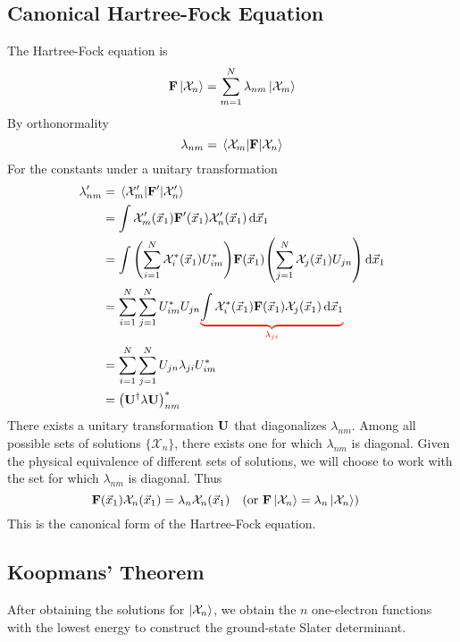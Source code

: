 \documentclass[12pt,a4paper,titlepage]{article}
\newcommand{\Chi}{\mathcal{X}} %
\begin{document}
\subsection{Canonical Hartree-Fock Equation}
The Hartree-Fock equation is
\begin{equation}
\vb{F}\ket{\Chi_{n}}=\sum_{m=1}^{N}\lambda_{nm}\ket{\Chi_{m}}
\end{equation}
By orthonormality
\begin{equation}
\lambda_{nm}=\mel{\Chi_{m}}{\vb{F}}{\Chi_{n}}
\end{equation}
For the constants under a unitary transformation
\begin{equation}
\begin{aligned}
\lambda_{nm}^{\prime}&=\mel{\Chi_{m}^{\prime}}{\vb{F}^{\prime}}{\Chi_{n}^{\prime}}\\
&=\int\Chi_{m}^{\prime}(\vec{x}_{1})\vb{F}^{\prime}(\vec{x}_{1})\Chi_{n}^{\prime}(\vec{x}_{1})\dd{\vec{x}_{1}}\\
&=\int\qty(\sum_{i=1}^{N}\Chi_{i}^{*}(\vec{x}_{1})U_{im}^{*})\vb{F}(\vec{x}_{1})\qty(\sum_{j=1}^{N}\Chi_{j}(\vec{x}_{1})U_{jn})\dd{\vec{x}_{1}}\\
&=\sum_{i=1}^{N}\sum_{j=1}^{N}U_{im}^{*}U_{jn}{\color{red}\underbrace{\color{black}\int\Chi_{i}^{*}(\vec{x}_{1})\vb{F}(\vec{x}_{1})\Chi_{j}(\vec{x}_{1})\dd{\vec{x}_{1}}}_{\lambda_{ji}}}\\
&=\sum_{i=1}^{N}\sum_{j=1}^{N}U_{jn}\lambda_{ji}U_{im}^{*}\\
&=\qty(\vb{U}^{\dagger}\vb{\lambda}\vb{U})^{*}_{nm}
\end{aligned}
\end{equation}
There exists a unitary transformation $\vb{U}$ that diagonalizes $\lambda_{nm}$. Among all possible sets of solutions $\{\Chi_{n}\}$, there exists one for which $\lambda_{nm}$ is diagonal. Given the physical equivalence of different sets of solutions, we will choose to work with the set for which $\lambda_{nm}$ is diagonal. Thus
\begin{equation}
\vb{F}(\vec{x}_{1})\Chi_{n}(\vec{x}_{1})=\lambda_{n}\Chi_{n}(\vec{x}_{1})\qq{(or $\vb{F}\ket{\Chi_{n}}=\lambda_{n}\ket{\Chi_{n}}$)}
\end{equation}
This is the canonical form of the Hartree-Fock equation.

\subsection{Koopmans' Theorem}
After obtaining the solutions for $\ket{\Chi_{n}}$, we obtain the $n$ one-electron functions with the lowest energy to construct the ground-state Slater determinant.\\
\end{document}
